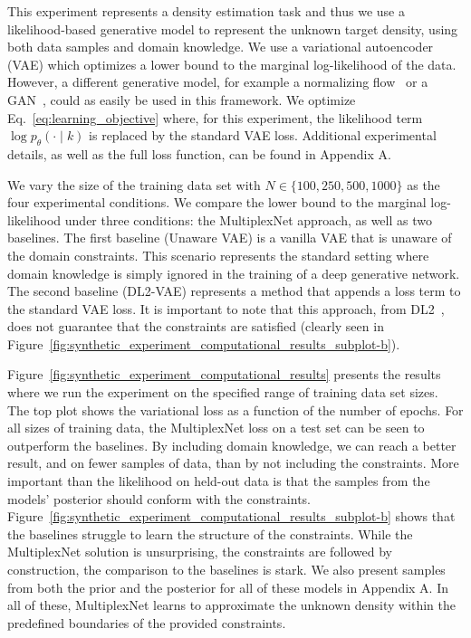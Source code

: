 \documentclass[letterpaper]{article} %
\begin{document}
This experiment represents a density estimation task and thus we use a likelihood-based generative model to represent the unknown target density, using both data samples and domain knowledge.
We use a variational autoencoder (VAE) which optimizes a lower bound to the marginal log-likelihood of the data.
However, a different generative model, for example a normalizing flow~\citep{papamakarios2019normalizing} or a GAN~\citep{goodfellow2014generative}, could as easily be used in this framework.
We optimize Eq.~\ref{eq:learning_objective} where, for this experiment, the likelihood term $\log p_\theta ( \cdot \mid k)$ is replaced by the standard VAE loss.
Additional experimental details, as well as the full loss function, can be found in Appendix A.

We vary the size of the training data set with $N \in \{ 100, 250, 500, 1000 \}$ as the four experimental conditions.
We compare the lower bound to the marginal log-likelihood under three conditions: the MultiplexNet approach, as well as two baselines.
The first baseline (Unaware VAE) is a vanilla VAE that is unaware of the domain constraints.
This scenario represents the standard setting where domain knowledge is simply ignored in the training of a deep generative network.
The second baseline (DL2-VAE) represents a method that appends a loss term to the standard VAE loss.
It is important to note that this approach, from DL2~\citep{fischer2018dl2}, does not guarantee that the constraints are satisfied (clearly seen in Figure~\ref{fig:synthetic_experiment_computational_results_subplot-b}).

Figure~\ref{fig:synthetic_experiment_computational_results} presents the results where we run the experiment on the specified range of training data set sizes.
The top plot shows the variational loss as a function of the number of epochs.
For all sizes of training data, the MultiplexNet loss on a test set can be seen to outperform the baselines.
By including domain knowledge, we can reach a better result, and on fewer samples of data, than by not including the constraints.
More important than the likelihood on held-out data is that the samples from the models' posterior should conform with the constraints.
Figure~\ref{fig:synthetic_experiment_computational_results_subplot-b} shows that the baselines struggle to learn the structure of the constraints.
While the MultiplexNet solution is unsurprising, the constraints are followed by construction, the comparison to the baselines is stark.
We also present samples from both the prior and the posterior for all of these models in Appendix A.
In all of these, MultiplexNet learns to approximate the unknown density within the predefined boundaries of the provided constraints.
\end{document}
